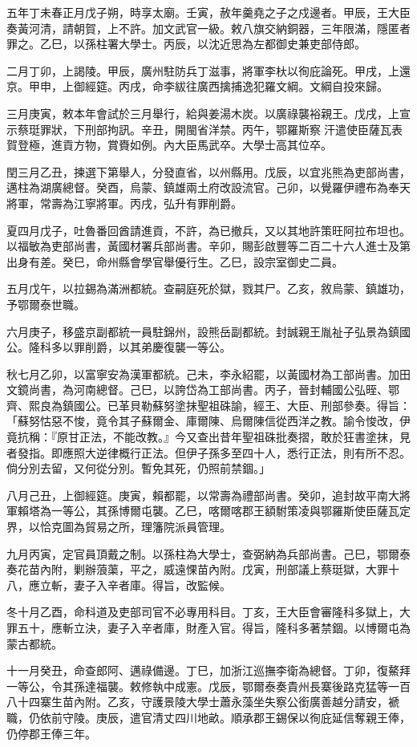 \begin{pinyinscope}
五年丁未春正月戊子朔，時享太廟。壬寅，赦年羹堯之子之戍邊者。甲辰，王大臣奏黃河清，請朝賀，上不許。加文武官一級。敕八旗交納銅器，三年限滿，隱匿者罪之。乙巳，以孫柱署大學士。丙辰，以沈近思為左都御史兼吏部侍郎。

二月丁卯，上謁陵。甲辰，廣州駐防兵丁滋事，將軍李杕以徇庇論死。甲戌，上還京。甲申，上御經筵。丙戌，命李紱往廣西擒捕逸犯羅文綱。文綱自投來歸。

三月庚寅，敕本年會試於三月舉行，給與姜湯木炭。以廣祿襲裕親王。戊戌，上宣示蔡珽罪狀，下刑部拘訊。辛丑，開閩省洋禁。丙午，鄂羅斯察汗遣使臣薩瓦表賀登極，進貢方物，賞賚如例。內大臣馬武卒。大學士高其位卒。

閏三月乙丑，揀選下第舉人，分發直省，以州縣用。戊辰，以宜兆熊為吏部尚書，邁柱為湖廣總督。癸酉，烏蒙、鎮雄兩土府改設流官。己卯，以覺羅伊禮布為奉天將軍，常壽為江寧將軍。丙戌，弘升有罪削爵。

夏四月戊子，吐魯番回酋請進貢，不許，為已撤兵，又以其地許策旺阿拉布坦也。以福敏為吏部尚書，黃國材署兵部尚書。辛卯，賜彭啟豐等二百二十六人進士及第出身有差。癸巳，命州縣會學官舉優行生。乙巳，設宗室御史二員。

五月戊午，以拉錫為滿洲都統。查嗣庭死於獄，戮其尸。乙亥，敘烏蒙、鎮雄功，予鄂爾泰世職。

六月庚子，移盛京副都統一員駐錦州，設熊岳副都統。封誠親王胤祉子弘景為鎮國公。隆科多以罪削爵，以其弟慶復襲一等公。

秋七月乙卯，以富寧安為漢軍都統。己未，李永紹罷，以黃國材為工部尚書。加田文鏡尚書，為河南總督。己巳，以誇岱為工部尚書。丙子，晉封輔國公弘晊、鄂齊、熙良為鎮國公。已革貝勒蘇努塗抹聖祖硃諭，經王、大臣、刑部參奏。得旨：「蘇努怙惡不悛，竟令其子蘇爾金、庫爾陳、烏爾陳信從西洋之教。諭令悛改，伊竟抗稱：『原甘正法，不能改教。』今又查出昔年聖祖硃批奏摺，敢於狂書塗抹，見者發指。即應照大逆律概行正法。但伊子孫多至四十人，悉行正法，則有所不忍。倘分別去留，又何從分別。暫免其死，仍照前禁錮。」

八月己丑，上御經筵。庚寅，賴都罷，以常壽為禮部尚書。癸卯，追封故平南大將軍賴塔為一等公，其孫博爾屯襲。乙巳，喀爾喀郡王額駙策凌與鄂羅斯使臣薩瓦定界，以恰克圖為貿易之所，理籓院派員管理。

九月丙寅，定官員頂戴之制。以孫柱為大學士，查弼納為兵部尚書。己巳，鄂爾泰奏花苗內附，剿辦蒗蕖，平之，威遠惈苗內附。戊寅，刑部議上蔡珽獄，大罪十八，應立斬，妻子入辛者庫。得旨，改監候。

冬十月乙酉，命科道及吏部司官不必專用科目。丁亥，王大臣會審隆科多獄上，大罪五十，應斬立決，妻子入辛者庫，財產入官。得旨，隆科多著禁錮。以博爾屯為蒙古都統。

十一月癸丑，命查郎阿、邁祿備邊。丁巳，加浙江巡撫李衛為總督。丁卯，復鰲拜一等公，令其孫達福襲。敕修執中成憲。戊辰，鄂爾泰奏貴州長寨後路克猛等一百八十四寨生苗內附。乙亥，守護景陵大學士蕭永藻坐失察公銜廣善越分請安，褫職，仍依前守陵。庚辰，遣官清丈四川地畝。順承郡王錫保以徇庇延信奪親王俸，仍停郡王俸三年。


\end{pinyinscope}
